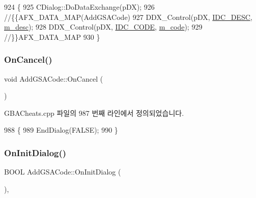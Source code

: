 \begin{DoxyCode}
924 \{
925   CDialog::DoDataExchange(pDX);
926   \textcolor{comment}{//\{\{AFX\_DATA\_MAP(AddGSACode)}
927   DDX\_Control(pDX, \mbox{\hyperlink{resource_8h_adb05cf1e74135587a9b3ab93a5152feb}{IDC\_DESC}}, \mbox{\hyperlink{class_add_g_s_a_code_a766cb9061a235616a856d3c1b16879db}{m\_desc}});
928   DDX\_Control(pDX, \mbox{\hyperlink{resource_8h_abb149f0043fd3834639ddb2d80d31723}{IDC\_CODE}}, \mbox{\hyperlink{class_add_g_s_a_code_a0a4c3486121bd6be93e8f64215fea1ab}{m\_code}});
929   \textcolor{comment}{//\}\}AFX\_DATA\_MAP}
930 \}
\end{DoxyCode}
\mbox{\label{class_add_g_s_a_code_aa0db7ac66785e11cd5f614a06f7a11a2}} 
\subsubsection{\texorpdfstring{On\+Cancel()}{OnCancel()}}
{\footnotesize\ttfamily void Add\+G\+S\+A\+Code\+::\+On\+Cancel (\begin{DoxyParamCaption}{ }\end{DoxyParamCaption})\hspace{0.3cm}{\ttfamily [protected]}}



G\+B\+A\+Cheats.\+cpp 파일의 987 번째 라인에서 정의되었습니다.


\begin{DoxyCode}
988 \{
989   EndDialog(FALSE);
990 \}
\end{DoxyCode}
\mbox{\label{class_add_g_s_a_code_af6ea2661ff2da964833f9e86f88cb1ff}} 
\subsubsection{\texorpdfstring{On\+Init\+Dialog()}{OnInitDialog()}}
{\footnotesize\ttfamily B\+O\+OL Add\+G\+S\+A\+Code\+::\+On\+Init\+Dialog (\begin{DoxyParamCaption}{ }\end{DoxyParamCaption})\hspace{0.3cm}{\ttfamily [protected]}, {\ttfamily [virtual]}}



